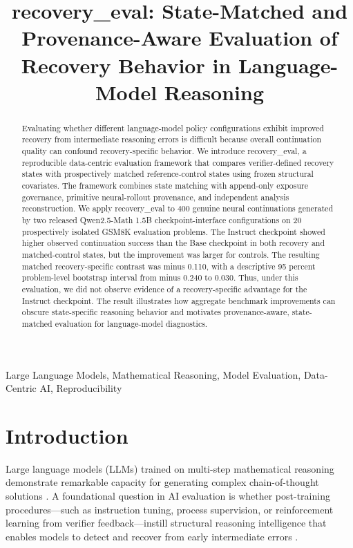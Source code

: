 \documentclass[10pt,conference,letterpaper]{IEEEtran}
\begin{document}
\title{recovery\_eval: State-Matched and Provenance-Aware Evaluation of Recovery Behavior in Language-Model Reasoning}

\author{
}

\maketitle

\begin{abstract}
Evaluating whether different language-model policy configurations exhibit improved recovery from intermediate reasoning errors is difficult because overall continuation quality can confound recovery-specific behavior. We introduce recovery\_eval, a reproducible data-centric evaluation framework that compares verifier-defined recovery states with prospectively matched reference-control states using frozen structural covariates. The framework combines state matching with append-only exposure governance, primitive neural-rollout provenance, and independent analysis reconstruction. We apply recovery\_eval to 400 genuine neural continuations generated by two released Qwen2.5-Math 1.5B checkpoint-interface configurations on 20 prospectively isolated GSM8K evaluation problems. The Instruct checkpoint showed higher observed continuation success than the Base checkpoint in both recovery and matched-control states, but the improvement was larger for controls. The resulting matched recovery-specific contrast was minus 0.110, with a descriptive 95 percent problem-level bootstrap interval from minus 0.240 to 0.030. Thus, under this evaluation, we did not observe evidence of a recovery-specific advantage for the Instruct checkpoint. The result illustrates how aggregate benchmark improvements can obscure state-specific reasoning behavior and motivates provenance-aware, state-matched evaluation for language-model diagnostics.
\end{abstract}

\begin{IEEEkeywords}
Large Language Models, Mathematical Reasoning, Model Evaluation, Data-Centric AI, Reproducibility
\end{IEEEkeywords}

\section{Introduction}
Large language models (LLMs) trained on multi-step mathematical reasoning demonstrate remarkable capacity for generating complex chain-of-thought solutions \cite{cobbe2021gsm8k, qwen25math2024}. A foundational question in AI evaluation is whether post-training procedures—such as instruction tuning, process supervision, or reinforcement learning from verifier feedback—instill structural reasoning intelligence that enables models to detect and recover from early intermediate errors \cite{lightman2023process, zelikman2022star}.
\end{document}
